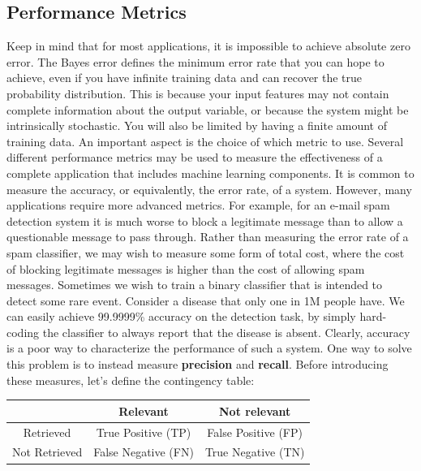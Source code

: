 \subsection{Performance Metrics}
Keep in mind that for most applications, it is impossible to achieve absolute
zero error. The Bayes error defines the minimum error rate that you can hope to
achieve, even if you have infinite training data and can recover the true probability distribution. This is because your input features may not contain complete information about the output variable, or because the system might be intrinsically stochastic. You will also be limited by having a finite amount of training data.\newline\newline
An important aspect is the choice of which metric to use. Several different performance metrics may be used to measure the effectiveness of a complete application that includes machine learning components. It is common to measure the accuracy, or equivalently, the error rate, of a system. However, many applications require more advanced metrics. For example, for an e-mail spam detection system it is much worse to block a legitimate message than to allow a questionable message to pass through. Rather than measuring the error rate of a spam classifier, we may wish to measure some form of total cost, where the cost of blocking legitimate messages is higher than the cost of allowing spam messages.\newline\newline
Sometimes we wish to train a binary classifier that is intended to detect some rare event. Consider a disease that only one in 1M people have. We can easily achieve 99.9999\% accuracy on the detection task, by simply hard-coding the classifier to always report that the disease is absent. Clearly, accuracy is a poor way to characterize the performance of such a system. One way to solve this problem is to instead measure \textbf{precision} and \textbf{recall}. Before introducing these measures, let's define the contingency table:
\begin{center}
    \begin{tabular}{c|c|c}
         & Relevant & Not relevant  \\
         \hline
         Retrieved & True Positive (TP) & False Positive (FP) \\
         Not Retrieved & False Negative (FN) & True Negative (TN)
    \end{tabular}
\end{center}
